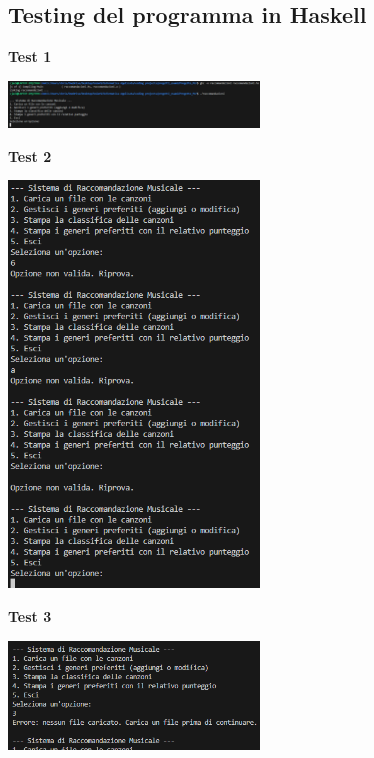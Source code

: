 \documentclass[a4paper,11pt]{article}
\begin{document}
\subsection{Testing del programma in Haskell}
\begin{center}
    \textbf{Test 1}
    \par
    \vspace{0.5cm}
    \includegraphics[width=0.5\textwidth]{htest1}
\end{center}
\begin{center}
    \textbf{Test 2}
    \par
    \vspace{0.5cm}
    \includegraphics[width=0.5\textwidth]{htest2}
\end{center}
\begin{center}
    \textbf{Test 3}
    \par
    \vspace{0.5cm}
    \includegraphics[width=0.5\textwidth]{htest3}
\end{center}
\end{document}
